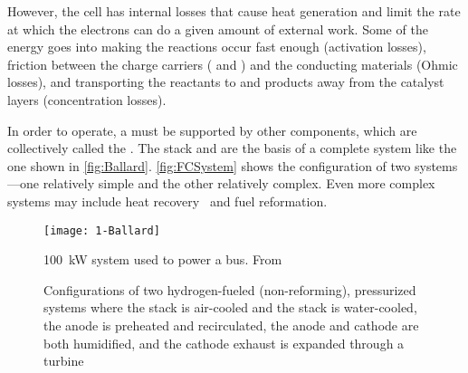 However, the cell has internal losses that cause heat generation and limit the rate at which the electrons can do a given amount of external work.  Some of the energy goes into making the reactions occur fast enough (activation losses), friction between the charge carriers ( and ) and the conducting materials (Ohmic losses), and transporting the reactants to and products away from the catalyst layers (concentration losses).

In order to operate, a  must be supported by other components, which are collectively called the .  The  stack and  are the basis of a complete  system like the one shown in \autoref{fig:Ballard}.  \autoref{fig:FCSystem} shows the configuration of two  systems---one relatively simple and the other relatively complex.  Even more complex  systems may include heat recovery~\cite{Faghri2005} and fuel reformation.
\begin{figure}[htbp]
  \texttt{[image: 1-Ballard]}%
  \caption[ system used to power a bus]{\SI{100}{kW}  system used to power a bus.  From }
  \label{fig:Ballard}
\end{figure}

\begin{figure}[htbp]
  \quad
  \caption[Configurations of two  systems]{Configurations of two hydrogen-fueled (non-reforming), pressurized  systems where  the stack is air-cooled and  the stack is water-cooled, the anode is preheated and recirculated, the anode and cathode are both humidified, and the cathode exhaust is expanded through a turbine}
  \label{fig:FCSystem}
\end{figure}

